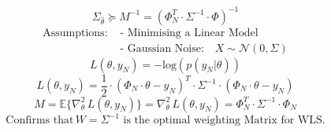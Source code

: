 \begin{tcolorbox}[colback=yellow!5!white,colframe=yellow!75!white,coltitle=black,title=Cramer-Rao-Inequality (Fisher information Matrix M)]
	\begin{equation*}
	{ \Sigma  }_{ \hat{\theta}  } \succeq M^{-1} = (\Phi^T_N \cdot \Sigma^{-1} \cdot \Phi)^{-1}
	\end{equation*}
	\begin{equation*}
	\begin{array}{llll}
	\text{Assumptions:} & \text{ - Minimising a Linear Model} \\
	& \text{ - Gaussian Noise:} \quad X \sim \mathcal{N}(0, \Sigma)
	\end{array}
	\end{equation*}
	\begin{equation*}
	L(\theta ,y_{ N }) = - \text{log} (p(y_N | \theta) )
	\end{equation*}
	\begin{equation*}
	L(\theta ,y_{ N }) = \frac { 1 }{ 2 } \cdot (\Phi _{ N } \cdot  \theta - y_N)^{ T } \cdot \Sigma^{-1} \cdot  (\Phi_N  \cdot \theta  -  y_N)
	\end{equation*}
	\begin{equation*}
	M = \mathbb{E} \{ \nabla^2_\theta \, L( \theta ,y_N) \}  = \nabla^2_\theta \, L(\theta ,y_N) = \Phi_N^T \cdot \Sigma^{-1} \cdot \Phi_N
	\end{equation*}
	\begin{equation*}
	\text{Confirms that} \, W = \Sigma^{-1} \text{ is the optimal weighting Matrix for WLS.}
	\end{equation*}
	
\end{tcolorbox}